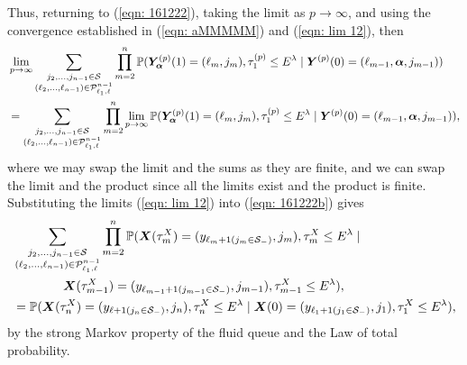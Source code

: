 Thus, returning to (\ref{eqn: 161222}), taking the limit as \(p\to\infty\), and using the convergence established in (\ref{eqn: aMMMMM}) and (\ref{eqn: lim 12}), then 
\begin{align}
	&\lim_{p\to\infty}\sum_{\substack{j_2,\dots,j_{n-1}\in\mathcal S \\ (\ell_2,\dots,\ell_{n-1}) \in\mathcal P^{n-1}_{\ell_1,\ell}}}\prod_{m=2}^{n}\mathbb P(\bm{Y}_{\bm{\alpha}}^{(p)}(1) = (\ell_m, j_m), \tau_{1}^{(p)}\leq E^\lambda \nonumber
            	 \mid \boldsymbol Y^{(p)}(0) = (\ell_{m-1},\boldsymbol\alpha, j_{m-1})) \nonumber 
	\\ &=\sum_{\substack{j_2,\dots,j_{n-1}\in\mathcal S \\ (\ell_2,\dots,\ell_{n-1}) \in\mathcal P^{n-1}_{\ell_1,\ell}}}\prod_{m=2}^{n}\lim_{p\to\infty} \mathbb P(\bm{Y}_{\bm{\alpha}}^{(p)}(1) = (\ell_m, j_m), \tau_{1}^{(p)}\leq E^\lambda 
            	 \mid \boldsymbol Y^{(p)}(0) = (\ell_{m-1}, \boldsymbol\alpha,
	 	 j_{m-1}) ),
	 \label{eqn: 161222b}
\end{align}
where we may swap the limit and the sums as they are finite, and we can swap the limit and the product since all the limits exist and the product is finite. Substituting the limits (\ref{eqn: lim 12}) into (\ref{eqn: 161222b}) gives 
\begin{align}
	&\sum_{\substack{j_2,\dots,j_{n-1}\in\mathcal S \\ (\ell_2,\dots,\ell_{n-1}) \in\mathcal P^{n-1}_{\ell_1,\ell}}} \prod_{m=2}^{n}\mathbb P(\boldsymbol X(\tau_m^X) = (y_{\ell_{m}+1(j_{m}\in\mathcal S_-)}, j_m), \tau_{m}^X\leq E^\lambda\mid \nonumber
            	\\&\qquad\qquad  \boldsymbol X(\tau_{m-1}^X)=(y_{\ell_{m-1}+1(j_{m-1}\in\mathcal S_-)},j_{m-1}),\tau_{m-1}^X\leq E^\lambda),\nonumber
		\\&= \mathbb P(\boldsymbol X(\tau_n^X) = (y_{\ell+1(j_{n}\in\mathcal S_-)}, 
		j_n), \tau_{n}^X\leq E^\lambda \mid \boldsymbol X(0)=(y_{\ell_{1}+1(j_{1}\in\mathcal S_-)},
		j_{1}), 
		\tau_1^X\leq E^\lambda),
\end{align}
by the strong Markov property of the fluid queue and the Law of total probability.

